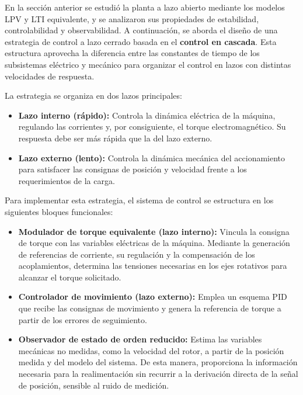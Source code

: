 \documentclass[blue,fullpaper]{ludusofficial}  %
\begin{document}
En la sección anterior se estudió la planta a lazo abierto mediante los modelos LPV y LTI equivalente, y se analizaron sus propiedades de estabilidad, controlabilidad y observabilidad. A continuación, se aborda el diseño de una estrategia de control a lazo cerrado basada en el \textbf{control en cascada}. Esta estructura aprovecha la diferencia entre las constantes de tiempo de los subsistemas eléctrico y mecánico para organizar el control en lazos con distintas velocidades de respuesta.

La estrategia se organiza en dos lazos principales:

\begin{itemize}
    \item \textbf{Lazo interno (rápido):} Controla la dinámica eléctrica de la máquina, regulando las corrientes y, por consiguiente, el torque electromagnético. Su respuesta debe ser más rápida que la del lazo externo.
    \item \textbf{Lazo externo (lento):} Controla la dinámica mecánica del accionamiento para satisfacer las consignas de posición y velocidad frente a los requerimientos de la carga.
\end{itemize}
    
Para implementar esta estrategia, el sistema de control se estructura en los siguientes bloques funcionales:

\begin{itemize}
    \item \textbf{Modulador de torque equivalente (lazo interno):} Vincula la consigna de torque con las variables eléctricas de la máquina. Mediante la generación de referencias de corriente, su regulación y la compensación de los acoplamientos, determina las tensiones necesarias en los ejes rotativos para alcanzar el torque solicitado.
    \item \textbf{Controlador de movimiento (lazo externo):} Emplea un esquema PID que recibe las consignas de movimiento y genera la referencia de torque a partir de los errores de seguimiento.
    \item \textbf{Observador de estado de orden reducido:} Estima las variables mecánicas no medidas, como la velocidad del rotor, a partir de la posición medida y del modelo del sistema. De esta manera, proporciona la información necesaria para la realimentación sin recurrir a la derivación directa de la señal de posición, sensible al ruido de medición.
\end{itemize}
\end{document}
